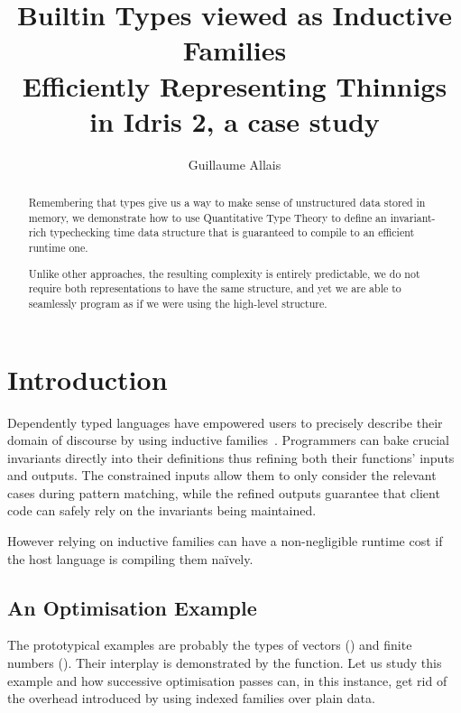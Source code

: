 \documentclass{article}
\newcommand{\idris}{Idris 2}
\begin{document}
\title{Builtin Types viewed as Inductive Families \\
{\large Efficiently Representing Thinnigs in \idris, a case study}}
\author{Guillaume Allais}

\maketitle

\begin{abstract}
  Remembering that types give us a way to make sense of unstructured data stored
  in memory, we demonstrate how to use Quantitative Type Theory to define an
  invariant-rich typechecking time data structure that is guaranteed to compile
  to an efficient runtime one.

  Unlike other approaches, the resulting complexity is entirely predictable, we do
  not require both representations to have the same structure, and yet we are able
  to seamlessly program as if we were using the high-level structure.
\end{abstract}

\section{Introduction}

Dependently typed languages have empowered users to precisely describe their domain
of discourse by using inductive families~\cite{DBLP:journals/fac/Dybjer94}.
%
Programmers can bake crucial invariants directly into their definitions thus refining
both their functions' inputs and outputs.
%
The constrained inputs allow them to only consider the relevant cases during pattern
matching, while the refined outputs guarantee that client code can safely rely on the
invariants being maintained.

However relying on inductive families can have a non-negligible runtime cost if
the host language is compiling them naïvely.

\subsection{An Optimisation Example}

The prototypical examples are probably the types of vectors ()
and finite numbers ().
%
Their interplay is demonstrated by the  function.
Let us study this example and how successive optimisation passes can, in this
instance, get rid of the overhead introduced by using indexed families over
plain data.
\end{document}
